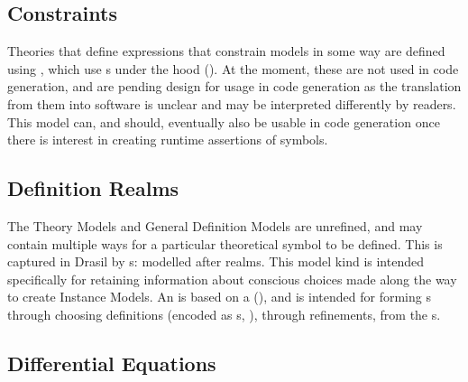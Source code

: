 
\subsection{Constraints}

\currentConstraintSetHaskell{}

Theories that define expressions that constrain models in some way are defined
using \EquationalConstraints{}, which use \ConstraintSet{}s under the hood
(). At the moment, these are not used in code generation, and are pending
design for usage in code generation as the translation from them into software
is unclear and may be interpreted differently by readers. This model can, and
should, eventually also be usable in code generation once there is interest in
creating runtime assertions of symbols.


\subsection{Definition Realms}

\currentDefiningExprHaskell{}

\currentMultiDefnHaskell{}

The Theory Models and General Definition Models are unrefined, and may contain
multiple ways for a particular theoretical symbol to be defined. This is
captured in Drasil by \EquationalRealm{}s: modelled after realms. This model kind is intended specifically for
retaining information about conscious choices made along the way to create
Instance Models. An \EquationalRealm{} is based on a \MultiDefn{}
(), and is intended for forming \QDefinition{}s
through choosing definitions (encoded as \DefiningExpr{}s,
), through refinements, from the \MultiDefn{}s.


\subsection{Differential Equations}

